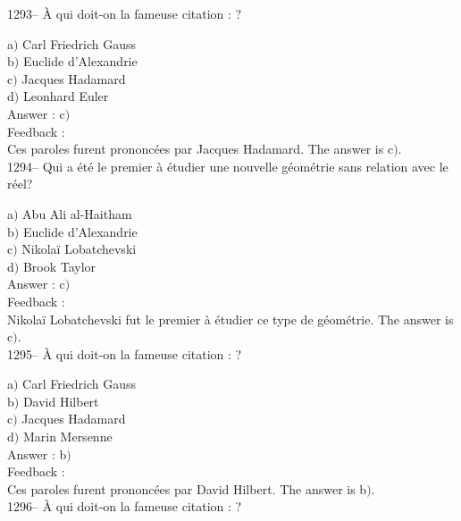 ﻿\documentclass[letterpaper, 12pt]{article}
\begin{document}
1293-- \`A qui doit-on la fameuse citation : \fg?

a$)$ Carl Friedrich Gauss \\
b$)$ Euclide d'Alexandrie \\
c$)$ Jacques Hadamard \\
d$)$ Leonhard Euler\\

Answer : c$)$\\

Feedback : \\
Ces paroles furent prononc\'ees par Jacques Hadamard.
The answer is  c$)$.\\

1294-- Qui a \'et\'e le premier \`a \'etudier une nouvelle
g\'eom\'etrie sans relation avec le r\'eel?

a$)$ Abu Ali al-Haitham \\
b$)$ Euclide d'Alexandrie \\
c$)$ Nikola\"i Lobatchevski \\
d$)$ Brook Taylor\\

Answer : c$)$\\

Feedback : \\
Nikola\"i Lobatchevski fut le premier \`a \'etudier ce type de
g\'eom\'etrie.
The answer is  c$)$.\\

1295-- \`A qui doit-on la fameuse citation : \fg ?

a$)$ Carl Friedrich Gauss \\
b$)$ David Hilbert \\
c$)$ Jacques Hadamard \\
d$)$ Marin Mersenne\\

Answer : b$)$\\

Feedback : \\
Ces paroles furent prononc\'ees par David Hilbert.
The answer is  b$)$.\\

1296-- \`A qui doit-on la fameuse citation : \fg ?
\end{document}
